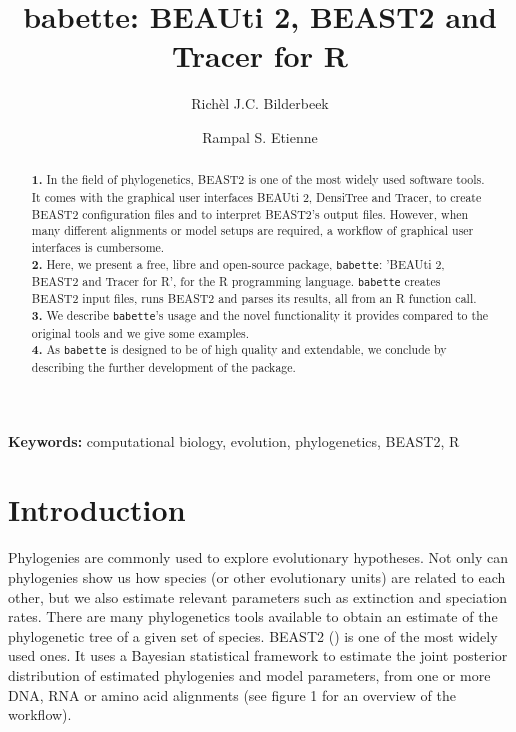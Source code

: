 \documentclass{article}
\title{babette: BEAUti 2, BEAST2 and Tracer for R}
\author[1]{Rich\`el J.C. Bilderbeek}
\author[1]{Rampal S. Etienne}
\affil[1]{Groningen Institute for Evolutionary Life Sciences, University of Groningen, Groningen, The Netherlands}
\begin{document}
\maketitle

\begin{abstract}

  \textbf{1. }
    In the field of phylogenetics, 
    BEAST2 is one of the most widely used software tools. 
    It comes with the graphical user interfaces BEAUti 2, DensiTree and Tracer,
    to create BEAST2 configuration files and to interpret BEAST2's output files. 
    However, when many different alignments or model 
    setups are required, a workflow of graphical user interfaces is cumbersome. \\
  \textbf{2. }
    Here, we present a free, libre and open-source package, \verb;babette;: 
    'BEAUti 2, BEAST2 and Tracer for R', for the R programming language. 
    \verb;babette; creates BEAST2 input files, runs BEAST2 and parses its results, 
    all from an R function call. \\
  \textbf{3. }
    We describe \verb;babette;'s usage and the novel functionality it provides
    compared to the original tools and we give some examples. \\
  \textbf{4. }
    As \verb;babette; is designed to be of high quality and extendable, 
    we conclude by describing the further development of the package. \\
\end{abstract}

{\bf Keywords:} computational biology, evolution, phylogenetics, BEAST2, R

\section{Introduction}

Phylogenies are commonly used to explore evolutionary hypotheses.
Not only can phylogenies show us how species (or other
evolutionary units) are related to each other, 
but we also estimate relevant parameters such as extinction and 
speciation rates.
There are many phylogenetics tools available to obtain an estimate 
of the phylogenetic tree of a given set of species. 
BEAST2 (\cite{bouckaert2014beast}) is one of the most widely used ones.
It uses a Bayesian statistical framework to estimate 
the joint posterior distribution of estimated phylogenies and model parameters, 
from one or more DNA, RNA or amino acid alignments (see figure 1 
for an overview of the workflow). 
\end{document}
